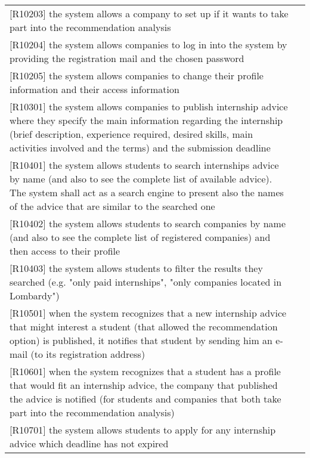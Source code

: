 \begin{table} [h!]
\begin{tabular}{ || P{7.5cm} P{7.5cm} || }
					[R10203] the system allows a company to set up if it wants to take part into the recommendation analysis & \\
					
					[R10204] the system allows companies to log in into the system by providing the registration mail and the chosen password & \\
					
					[R10205] the system allows companies to change their profile information and their access information & \\
					
					[R10301] the system allows companies to publish internship advice where they specify the main information regarding the internship (brief description, experience required, desired skills, main activities involved and the terms) and the submission deadline & \\
					
					[R10401] the system allows students to search internships advice by name (and also to see the complete list of available advice). The system shall act as a search engine to present also the names of the advice that are similar to the searched one & \\
					
					[R10402] the system allows students to search companies by name (and also to see the complete list of registered companies) and then access to their profile & \\
					
					[R10403] the system allows students to filter the results they searched (e.g. "only paid internships", "only companies located in Lombardy") & \\
					
					[R10501] when the system recognizes that a new internship advice that might interest a student (that allowed the recommendation option) is published, it notifies that student by sending him an e-mail (to its registration address) & \\
					
					[R10601] when the system recognizes that a student has a profile that would fit an internship advice, the company that published the advice is notified (for students and companies that both take part into the recommendation analysis) & \\
					
					[R10701] the system allows students to apply for any internship advice which deadline has not expired & \\
					

\end{tabular}
\end{table}

